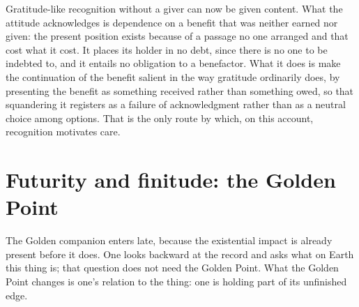 

Gratitude-like recognition without a giver can now be given content. What the
attitude acknowledges is dependence on a benefit that was neither earned nor
given: the present position exists because of a passage no one arranged and
that cost what it cost. It places its holder in no debt, since there is no one
to be indebted to, and it entails no obligation to a benefactor. What it does
is make the continuation of the benefit salient in the way gratitude
ordinarily does, by presenting the benefit as something received rather than
something owed, so that squandering it registers as a failure of
acknowledgment rather than as a neutral choice among options. That is the
only route by which, on this account, recognition motivates care.

\section{Futurity and finitude: the Golden Point}\label{sec:golden}

The Golden companion enters late, because the existential impact is already
present before it does. One looks backward at the record and asks what on
Earth this thing is; that question does not need the Golden Point. What the
Golden Point changes is one's relation to the thing: one is holding part of
its unfinished edge.


